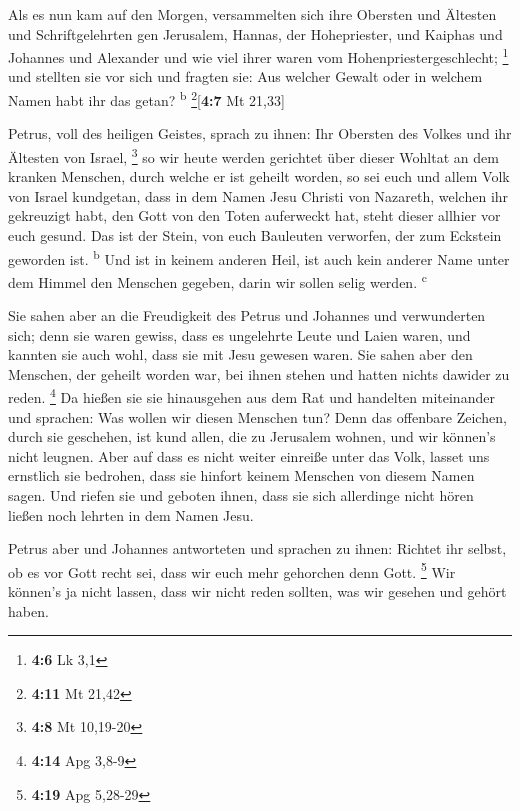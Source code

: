  Als es nun kam auf den Morgen, versammelten sich ihre
Obersten und Ältesten und Schriftgelehrten gen Jerusalem, 
Hannas, der Hohepriester, und Kaiphas und Johannes und Alexander und wie
viel ihrer waren vom Hohenpriestergeschlecht; \footnote{\textbf{4:6} Lk
  3,1}  und stellten sie vor sich und fragten sie: Aus
welcher Gewalt oder in welchem Namen habt ihr das getan?
\textsuperscript{b} \footnote{\textbf{4:11} Mt 21,42}{[}\textbf{4:7} Mt
21,33{]}

 Petrus, voll des heiligen Geistes, sprach zu ihnen: Ihr
Obersten des Volkes und ihr Ältesten von Israel, \footnote{\textbf{4:8}
  Mt 10,19-20}  so wir heute werden gerichtet über dieser
Wohltat an dem kranken Menschen, durch welche er ist geheilt worden,
 so sei euch und allem Volk von Israel kundgetan, dass in
dem Namen Jesu Christi von Nazareth, welchen ihr gekreuzigt habt, den
Gott von den Toten auferweckt hat, steht dieser allhier vor euch gesund.
 Das ist der Stein, von euch Bauleuten verworfen, der zum
Eckstein geworden ist. \textsuperscript{b}  Und ist in
keinem anderen Heil, ist auch kein anderer Name unter dem Himmel den
Menschen gegeben, darin wir sollen selig werden. \textsuperscript{c}

 Sie sahen aber an die Freudigkeit des Petrus und
Johannes und verwunderten sich; denn sie waren gewiss, dass es
ungelehrte Leute und Laien waren, und kannten sie auch wohl, dass sie
mit Jesu gewesen waren.  Sie sahen aber den Menschen, der
geheilt worden war, bei ihnen stehen und hatten nichts dawider zu reden.
\footnote{\textbf{4:14} Apg 3,8-9}  Da hießen sie sie
hinausgehen aus dem Rat und handelten miteinander und sprachen:
 Was wollen wir diesen Menschen tun? Denn das offenbare
Zeichen, durch sie geschehen, ist kund allen, die zu Jerusalem wohnen,
und wir können's nicht leugnen.  Aber auf dass es nicht
weiter einreiße unter das Volk, lasset uns ernstlich sie bedrohen, dass
sie hinfort keinem Menschen von diesem Namen sagen.  Und
riefen sie und geboten ihnen, dass sie sich allerdinge nicht hören
ließen noch lehrten in dem Namen Jesu.

 Petrus aber und Johannes antworteten und sprachen zu
ihnen: Richtet ihr selbst, ob es vor Gott recht sei, dass wir euch mehr
gehorchen denn Gott. \footnote{\textbf{4:19} Apg 5,28-29}
 Wir können's ja nicht lassen, dass wir nicht reden
sollten, was wir gesehen und gehört haben.

